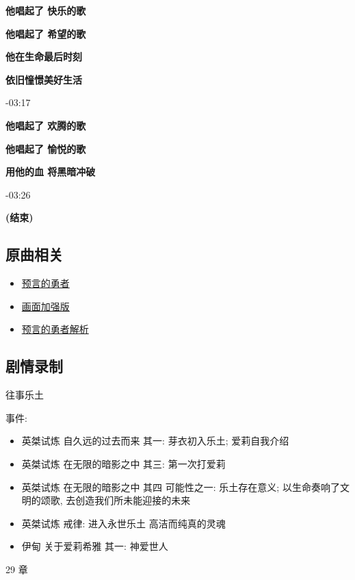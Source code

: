 \documentclass[a4paper]{article}
\begin{document}
\textbf{他唱起了 快乐的歌}

\textbf{他唱起了 希望的歌}

\textbf{他在生命最后时刻}

\textbf{依旧憧憬美好生活}

-03:17

\textbf{他唱起了 欢腾的歌}

\textbf{他唱起了 愉悦的歌}

\textbf{用他的血 将黑暗冲破}

-03:26

\textbf{(结束)}

\subsection{原曲相关}

\begin{itemize}
    \item \href{https://www.bilibili.com/video/BV1Zf4y1Z75m/}{预言的勇者}
    \item \href{https://www.bilibili.com/video/BV1rr4y177C9/}{画面加强版}
    \item \href{https://www.bilibili.com/video/BV1KT411z7Vr/}{预言的勇者解析}
\end{itemize}

\subsection{剧情录制}

往事乐土

事件:

\begin{itemize}
    \item 英桀试炼 自久远的过去而来 其一: 芽衣初入乐土; 爱莉自我介绍
    \item 英桀试炼 在无限的暗影之中 其三: 第一次打爱莉
    \item 英桀试炼 在无限的暗影之中 其四 可能性之一: 乐土存在意义; 以生命奏响了文明的颂歌, 去创造我们所未能迎接的未来
    \item 英桀试炼 戒律: 进入永世乐土 高洁而纯真的灵魂
    \item 伊甸 关于爱莉希雅 其一: 神爱世人
\end{itemize}

29 章
\end{document}
